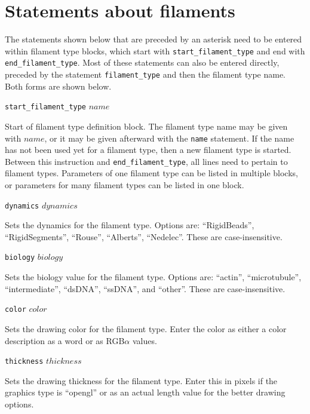 \documentclass {scrbook}
\newcommand {\ttt} {\texttt}
\begin{document}
\section{Statements about filaments}

The statements shown below that are preceded by an asterisk need to be entered within filament type blocks, which start with \ttt{start\_filament\_type} and end with \ttt{end\_filament\_type}. Most of these statements can also be entered directly, preceded by the statement \ttt{filament\_type} and then the filament type name. Both forms are shown below.

\begin{description}

\item{\ttt{start\_filament\_type} $name$}

Start of filament type definition block. The filament type name may be given with $name$, or it may be given afterward with the \ttt{name} statement. If the name has not been used yet for a filament type, then a new filament type is started. Between this instruction and \ttt{end\_filament\_type}, all lines need to pertain to filament types. Parameters of one filament type can be listed in multiple blocks, or parameters for many filament types can be listed in one block.

\item{\ttt{dynamics} $dynamics$}

Sets the dynamics for the filament type. Options are: ``RigidBeads'', ``RigidSegments'', ``Rouse'', ``Alberts'', ``Nedelec''. These are case-insensitive.

\item{\ttt{biology} $biology$}

Sets the biology value for the filament type. Options are: ``actin'', ``microtubule'', ``intermediate'', ``dsDNA'', ``ssDNA'', and ``other''. These are case-insensitive.

\item{\ttt{color} $color$}

Sets the drawing color for the filament type. Enter the color as either a color description as a word or as RGB$\alpha$ values.

\item{\ttt{thickness} $thickness$}

Sets the drawing thickness for the filament type. Enter this in pixels if the graphics type is ``opengl'' or as an actual length value for the better drawing options.


\end{description}
\end{document}
